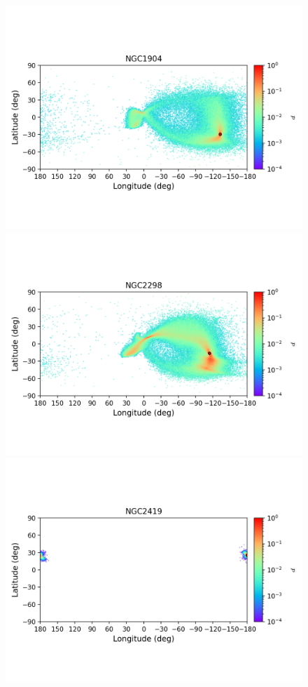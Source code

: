 \begin{figure}
        \includegraphics[clip=true, trim = 0mm 20mm 0mm 10mm, width=1\columnwidth]{images/error_plots_NGC1904.png}
        \includegraphics[clip=true, trim = 0mm 20mm 0mm 10mm, width=1\columnwidth]{images/error_plots_NGC2298.png}
        \includegraphics[clip=true, trim = 0mm 20mm 0mm 10mm, width=1\columnwidth]{images/error_plots_NGC2419.png}

\end{figure}
